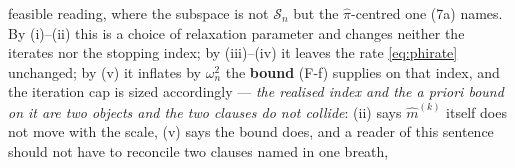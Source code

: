 \begin{definition}
{feasible reading, where the subspace is not $\mathcal S_n$ but the $\hat\pi$-centred one
\textup{(7a)} names}. By (i)--(ii) this is a choice of relaxation parameter and changes neither the
iterates nor the stopping index; by (iii)--(iv) it leaves the rate \eqref{eq:phirate} unchanged; by (v)
it inflates by $\omega_n^{2}$ the \textbf{bound} \textup{(F-f)} supplies on that index, and the iteration
cap is sized accordingly --- \emph{the realised index and the \emph{a priori} bound on it are two
objects and the two clauses do not collide}: (ii) says $\hat m^{(k)}$ itself does not move with the
scale, (v) says the bound does, and a reader of this sentence should not have to reconcile two clauses
named in one breath,

\end{definition}
